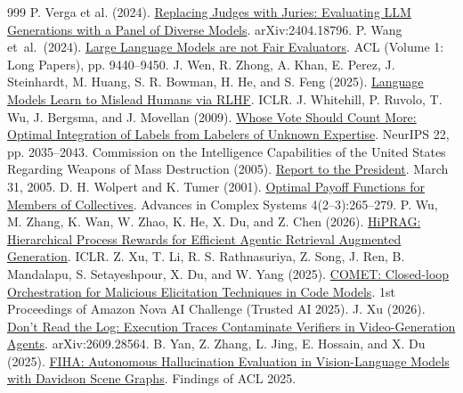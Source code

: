 \documentclass[12pt,letterpaper]{article}
\begin{document}
\begin{thebibliography}{999}
 P. Verga et al. (2024). \href{https://arxiv.org/abs/2404.18796}{Replacing Judges with Juries: Evaluating LLM Generations with a Panel of Diverse Models}. arXiv:2404.18796.
 P. Wang et~al.\ (2024). \href{https://doi.org/10.18653/v1/2024.acl-long.511}{Large Language Models are not Fair Evaluators}. ACL (Volume 1: Long Papers), pp. 9440--9450.
 J. Wen, R. Zhong, A. Khan, E. Perez, J. Steinhardt, M. Huang, S. R. Bowman, H. He, and S. Feng (2025). \href{https://arxiv.org/abs/2409.12822}{Language Models Learn to Mislead Humans via RLHF}. ICLR.
 J. Whitehill, P. Ruvolo, T. Wu, J. Bergsma, and J. Movellan (2009). \href{https://proceedings.neurips.cc/paper/2009/hash/f899139df5e1059396431415e770c6dd-Abstract.html}{Whose Vote Should Count More: Optimal Integration of Labels from Labelers of Unknown Expertise}. NeurIPS 22, pp. 2035--2043.
 Commission on the Intelligence Capabilities of the United States Regarding Weapons of Mass Destruction (2005). \href{https://govinfo.library.unt.edu/wmd/report/index.html}{Report to the President}. March 31, 2005.
 D. H. Wolpert and K. Tumer (2001). \href{https://doi.org/10.1142/S0219525901000188}{Optimal Payoff Functions for Members of Collectives}. Advances in Complex Systems 4(2--3):265--279.
 P. Wu, M. Zhang, K. Wan, W. Zhao, K. He, X. Du, and Z. Chen (2026). \href{https://proceedings.iclr.cc/paper_files/paper/2026/hash/85255cf8f2d2318cc7cffd0b1bc66625-Abstract-Conference.html}{HiPRAG: Hierarchical Process Rewards for Efficient Agentic Retrieval Augmented Generation}. ICLR.
 Z. Xu, T. Li, R. S. Rathnasuriya, Z. Song, J. Ren, B. Mandalapu, S. Setayeshpour, X. Du, and W. Yang (2025). \href{https://www.amazon.science/nova-ai-challenge/proceedings/comet-closed-loop-orchestration-for-malicious-elicitation-techniques-in-code-models}{COMET: Closed-loop Orchestration for Malicious Elicitation Techniques in Code Models}. 1st Proceedings of Amazon Nova AI Challenge (Trusted AI 2025).
 J. Xu (2026). \href{https://arxiv.org/abs/2609.28564}{Don't Read the Log: Execution Traces Contaminate Verifiers in Video-Generation Agents}. arXiv:2609.28564.
 B. Yan, Z. Zhang, L. Jing, E. Hossain, and X. Du (2025). \href{https://arxiv.org/abs/2409.13612}{FIHA: Autonomous Hallucination Evaluation in Vision-Language Models with Davidson Scene Graphs}. Findings of ACL 2025.

\end{thebibliography}
\end{document}

